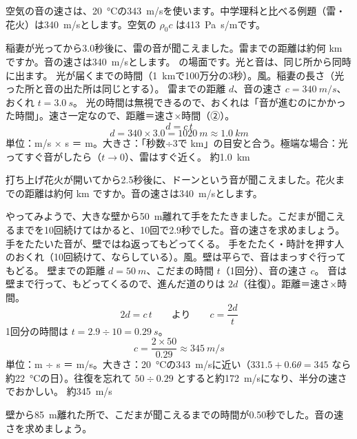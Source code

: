 
\noindent 空気の音の速さは、\qty{20}{\celsius}の\qty{343}{m/s}を使います。中学理科と比べる例題（雷・花火）は\qty{340}{m/s}とします。空気の $\rho_0c$ は\qty{413}{Pa.s/m}です。

\begin{phreidai}[雷までの距離]
\label{ph:波-9:ex1}稲妻が光ってから3.0秒後に、雷の音が聞こえました。雷までの距離は約何 km ですか。音の速さは\qty{340}{m/s}とします。
\phbamen
\bkhatenaref の場面です。光と音は、同じ所から同時に出ます。
\phmushi
光が届くまでの時間（\qty{1}{km}で100万分の3秒）。風。稲妻の長さ（光った所と音の出た所は同じとする）。
\phzu
雷までの距離 $d$、音の速さ $c=\qty{340}{m/s}$、おくれ $t=\qty{3.0}{s}$。
\phriyu
光の時間は無視できるので、おくれは「音が進むのにかかった時間」。速さ一定なので、距離＝速さ×時間（②）。
\phtateru
\[ d=c\,t \]
\phtoku
\[ d=340\times3.0=\qty{1020}{m}\approx\qty{1.0}{km} \]
\phtashikame
単位：m/s × s ＝ m。大きさ：「秒数÷3で km」の目安と合う。極端な場合：光ってすぐ音がしたら（$t\to0$）、雷はすぐ近く。
\kotae 約\qty{1.0}{km}
\end{phreidai}
\begin{jibun}
打ち上げ花火が開いてから2.5秒後に、ドーンという音が聞こえました。花火までの距離は約何 km ですか。音の速さは\qty{340}{m/s}とします。
\end{jibun}

\begin{phreidai}[こだまで音の速さをはかる]
\label{ph:波-9:ex2}やってみようで、大きな壁から\qty{50}{m}離れて手をたたきました。こだまが聞こえるまでを10回続けてはかると、10回で2.9秒でした。音の速さを求めましょう。
\phbamen
手をたたいた音が、壁ではね返ってもどってくる。
\phmushi
手をたたく・時計を押す人のおくれ（10回続けて、ならしている）。風。壁は平らで、音はまっすぐ行ってもどる。
\phzu
壁までの距離 $d=\qty{50}{m}$、こだまの時間 $t$（1回分）、音の速さ $c$。
\phriyu
音は壁まで行って、もどってくるので、進んだ道のりは $2d$（往復）。距離＝速さ×時間。
\phtateru
\[ 2d=c\,t\qquad\text{より}\qquad c=\frac{2d}{t} \]
\phtoku
1回分の時間は $t=2.9\div10=\qty{0.29}{s}$。
\[ c=\frac{2\times50}{0.29}\approx\qty{345}{m/s} \]
\phtashikame
単位：m ÷ s ＝ m/s。大きさ：\qty{20}{\celsius}の\qty{343}{m/s}に近い（$331.5+0.6\theta=345$ なら約\qty{22}{\celsius}の日）。往復を忘れて $50\div0.29$ とすると約\qty{172}{m/s}になり、半分の速さでおかしい。
\kotae 約\qty{345}{m/s}
\end{phreidai}
\begin{jibun}
壁から\qty{85}{m}離れた所で、こだまが聞こえるまでの時間が0.50秒でした。音の速さを求めましょう。
\end{jibun}

